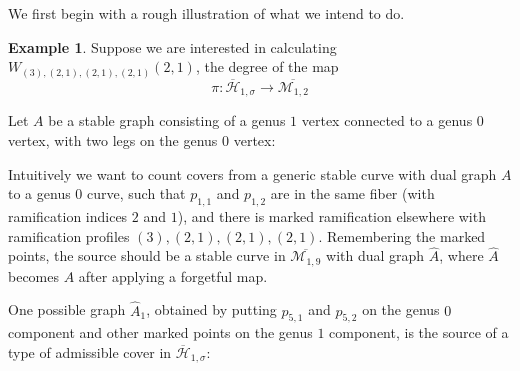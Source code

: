 \documentclass[thesis]{thesis-umich}           %
\newcommand{\Hb}{\overline{\mathcal H}}
\theoremstyle{definition}
\newtheorem{eg}[thm]{Example}
\begin{document}
We first begin with a rough illustration of what we intend to do.

\begin{eg}
  \label{eg:fourtorsion}
  Suppose we are interested in calculating $W_{(3),(2,1),(2,1),(2,1)}(2,1)$, the degree of the map
  \[
  \pi:\Hb_{1,\sigma}\to\overline{\mathcal M_{1,2}}
  \]
  
  Let $A$ be a stable graph consisting of a genus $1$ vertex connected to a genus $0$ vertex, with two legs on the
  genus $0$ vertex:

  

  Intuitively we want to count covers from a generic stable curve with dual graph $A$ to a genus $0$
  curve, such that $p_{1,1}$ and $p_{1,2}$ are in the same fiber (with ramification indices $2$ and $1$),
  and there is marked ramification elsewhere with ramification profiles $(3),(2,1),(2,1),(2,1)$.
  Remembering the marked points, the source should be a stable curve in $\overline{\mathcal M_{1,9}}$ with dual graph $\hat A$, where $\hat A$
  becomes $A$ after applying a forgetful map.

  One possible graph $\hat A_1$, obtained by putting $p_{5,1}$ and $p_{5,2}$ on the genus $0$ component and other
  marked points on the genus $1$ component, is the source of a type of admissible cover in $\Hb_{1,\sigma}$:

                  \begin{tikzpicture}[thick,amat/.style={matrix of nodes,nodes in empty cells,
  row sep=2.5em,rounded corners,
  nodes={draw,solid,circle,minimum size=1.0cm}},
  dmat/.style={matrix of nodes,nodes in empty cells,row sep=2.5em,nodes={minimum size=1.0cm},draw=myred},
  fsnode/.style={fill=myblue},
  ssnode/.style={fill=mygreen}]


\end{tikzpicture}
\end{eg}
\end{document}
